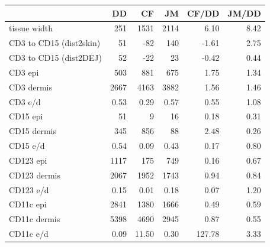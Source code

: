 \documentclass{article}
\begin{document}
\begin{tabular}{lrrrrr}
   \hline  &DD& CF& JM& CF/DD& JM/DD\\ 
\hline
tissue width & 251 & 1531 & 2114 &   6.10 & 8.42 \\ 
  CD3 to CD15 (dist2skin) & 51 & -82 & 140 &  -1.61 & 2.75 \\ 
  CD3 to CD15 (dist2DEJ) & 52 & -22 & 23 &  -0.42 & 0.44 \\ 
   \hline
CD3 epi & 503 & 881 & 675 &   1.75 & 1.34 \\ 
  CD3 dermis & 2667 & 4163 & 3882 &   1.56 & 1.46 \\ 
  CD3 e/d & 0.53 &  0.29 & 0.57 &   0.55 & 1.08 \\ 
   \hline
CD15 epi & 51 & 9 & 16 &   0.18 & 0.31 \\ 
  CD15 dermis & 345 & 856 & 88 &   2.48 & 0.26 \\ 
  CD15 e/d & 0.54 &  0.09 & 0.43 &   0.17 & 0.80 \\ 
   \hline
CD123 epi & 1117 & 175 & 749 &   0.16 & 0.67 \\ 
  CD123 dermis & 2067 & 1952 & 1743 &   0.94 & 0.84 \\ 
  CD123 e/d & 0.15 &  0.01 & 0.18 &   0.07 & 1.20 \\ 
   \hline
CD11c epi & 2841 & 1380 & 1666 &   0.49 & 0.59 \\ 
  CD11c dermis & 5398 & 4690 & 2945 &   0.87 & 0.55 \\ 
  CD11c e/d & 0.09 & 11.50 & 0.30 & 127.78 & 3.33 \\ 
   \hline
\end{tabular}
\end{document}
